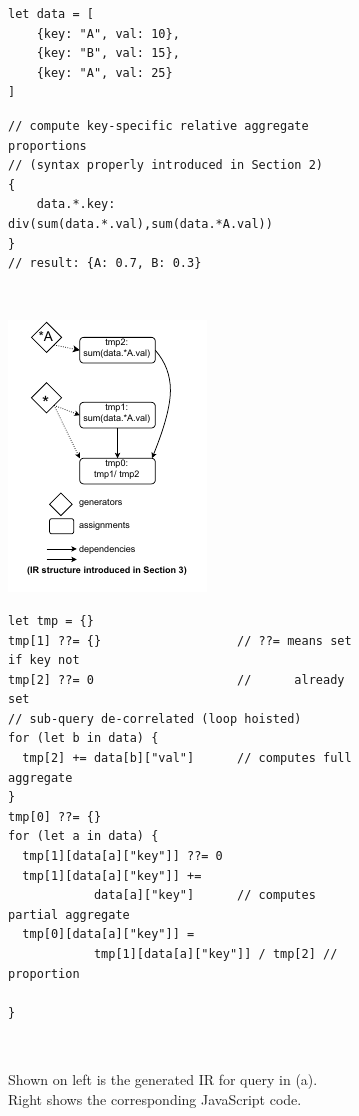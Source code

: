 \documentclass[runningheads]{llncs}
\begin{document}
\begin{figure}
\begin{subfigure}{\textwidth}
\begin{minipage}{0.3\textwidth}
\begin{lstlisting}[style=JavaScript,columns=flexible]
let data = [
    {key: "A", val: 10},
    {key: "B", val: 15},
    {key: "A", val: 25}
]
\end{lstlisting}
\end{minipage}
\begin{minipage}{0.7\textwidth}
\begin{lstlisting}[style=JavaScript,columns=flexible]
// compute key-specific relative aggregate proportions
// (syntax properly introduced in Section 2)
{  
    data.*.key: div(sum(data.*.val),sum(data.*A.val)) 
}
// result: {A: 0.7, B: 0.3}
\end{lstlisting}
\end{minipage}

~\label{fig:intro_query}
\end{subfigure}

\begin{subfigure}{\textwidth}
\begin{minipage}{0.38\textwidth}
\centering
\includegraphics{images/intro_ir.pdf}
\end{minipage}
\begin{minipage}{0.62\textwidth}
\begin{lstlisting}[style=JavaScript,columns=flexible]
let tmp = {}
tmp[1] ??= {}                   // ??= means set if key not 
tmp[2] ??= 0                    //      already set
// sub-query de-correlated (loop hoisted)
for (let b in data) {
  tmp[2] += data[b]["val"]      // computes full aggregate
}
tmp[0] ??= {}
for (let a in data) {
  tmp[1][data[a]["key"]] ??= 0
  tmp[1][data[a]["key"]] +=
            data[a]["key"]      // computes partial aggregate
  tmp[0][data[a]["key"]] = 
            tmp[1][data[a]["key"]] / tmp[2] // proportion

}
\end{lstlisting}
\end{minipage}
\caption{Shown on left is the generated IR for query in (a). Right shows the corresponding 
JavaScript code.}~\label{fig:ir_code}
\end{subfigure}

\caption{}\label{fig:intro}
\vspace{-5mm}
\end{figure}
\end{document}
